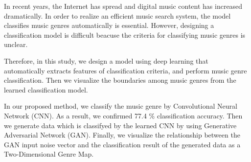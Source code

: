 \documentclass[a4paper,11pt]{jreport}
\begin{document}
\begin{engabstract}
In recent years, the Internet has spread and digital music content has increased dramatically. In order to realize an efficient music search system, the model classifies music genres automatically is essential. However, designing a classification model is difficult beacuse the criteria for classifying music genres is unclear. 

Therefore, in this study, we design a model using deep learning that automatically extracts features of classification criteria, and perform music genre classification. Then we visualize the boundaries among music genres from the learned classification model.


In our proposed method, we classify the music genre by Convolutional Neural Network (CNN). As a result, we confirmed 77.4 \% classification accuracy. Then we generate data which is classifyed by the learned CNN by using Generative Adversarial Network (GAN). Finally, we visualize the relationship between the GAN input noise vector and the classification result of the generated data as a Two-Dimensional Genre Map.

\end{engabstract}

\contents








\end{document}
